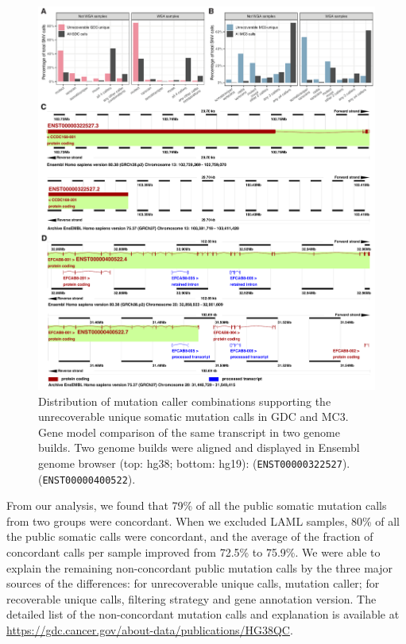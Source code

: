 \begin{figure}[tbp]
    \centering
    \includegraphics[width=\linewidth]{figures/chap02_mutation_pipeline_qc/supp_figure_combined.pdf}
    \caption{%
        Distribution of mutation caller combinations supporting the unrecoverable unique somatic  mutation calls in  GDC and  MC3.
        Gene model comparison of the same transcript in two genome builds. Two genome builds were aligned and displayed in Ensembl genome browser (top: hg38; bottom: hg19):
          (\texttt{ENST00000322527}).
          (\texttt{ENST00000400522}).
    }
    \label{fig:mut-call-qc-supp}
\end{figure}

From our analysis, we found that 79\% of all the public somatic mutation calls from two groups were concordant. When we excluded LAML samples, 80\% of all the public somatic calls were concordant, and the average of the fraction of concordant calls per sample improved from 72.5\% to 75.9\%. We were able to explain the remaining non-concordant public mutation calls by the three major sources of the differences: for unrecoverable unique calls, mutation caller; for recoverable unique calls, filtering strategy and gene annotation version. The detailed list of the non-concordant mutation calls and explanation is available at \url{https://gdc.cancer.gov/about-data/publications/HG38QC}.

